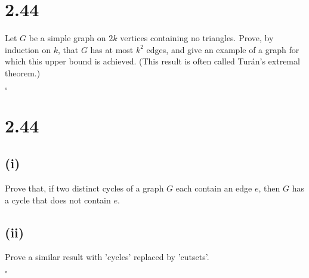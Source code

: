 \documentclass[11pt]{article}
\begin{document}

\section*{2.44}

Let $G$ be a simple graph on $2k$ vertices containing no triangles.
Prove, by induction on $k$, that $G$ has at most $k^2$ edges, and give an example of a graph for which this upper bound is achieved.
(This result is often called Turán’s extremal theorem.)

$\square$

\section*{2.44}

\subsection*{(i)}
Prove that, if two distinct cycles of a graph $G$ each contain an edge $e$, then $G$ has a cycle that does not contain $e$.

\subsection*{(ii)}
Prove a similar result with 'cycles' replaced by 'cutsets'.

$\square$

\printbibliography
\end{document}
